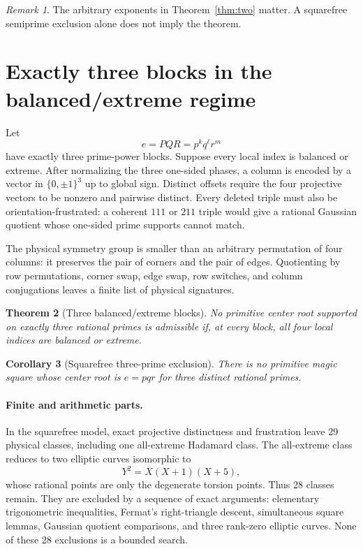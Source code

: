 \documentclass[11pt]{article}
\newtheorem{theorem}{Theorem}[section]
\newtheorem{corollary}[theorem]{Corollary}
\theoremstyle{definition}
\theoremstyle{remark}
\newtheorem{remark}[theorem]{Remark}
\begin{document}
\begin{remark}
The arbitrary exponents in Theorem~\ref{thm:two} matter.  A squarefree
semiprime exclusion alone does not imply the theorem.
\end{remark}

\section{Exactly three blocks in the balanced/extreme regime}

Let
\begin{equation}
e=PQR=p^kq^\ell r^m
\end{equation}
have exactly three prime-power blocks.  Suppose every local index is balanced
or extreme.  After normalizing the three one-sided phases, a column is encoded
by a vector in $\{0,\pm1\}^3$ up to global sign.  Distinct offsets require the
four projective vectors to be nonzero and pairwise distinct.  Every deleted
triple must also be orientation-frustrated: a coherent $111$ or $211$ triple
would give a rational Gaussian quotient whose one-sided prime supports cannot
match.

The physical symmetry group is smaller than an arbitrary permutation of four
columns: it preserves the pair of corners and the pair of edges.  Quotienting
by row permutations, corner swap, edge swap, row switches, and column
conjugations leaves a finite list of physical signatures.

\begin{theorem}[Three balanced/extreme blocks]
\label{thm:three}
No primitive center root supported on exactly three rational primes is
admissible if, at every block, all four local indices are balanced or extreme.
\end{theorem}

\begin{corollary}[Squarefree three-prime exclusion]
There is no primitive magic square whose center root is $e=pqr$ for three
distinct rational primes.
\end{corollary}

\paragraph{Finite and arithmetic parts.}
In the squarefree model, exact projective distinctness and frustration leave
29 physical classes, including one all-extreme Hadamard class.  The
all-extreme class reduces to two elliptic curves isomorphic to
\begin{equation}
Y^2=X(X+1)(X+5),
\end{equation}
whose rational points are only the degenerate torsion points.  Thus 28 classes
remain.  They are excluded by a sequence of exact arguments: elementary
trigonometric inequalities, Fermat's right-triangle descent, simultaneous
square lemmas, Gaussian quotient comparisons, and three rank-zero elliptic
curves.  None of these 28 exclusions is a bounded search.
\end{document}
